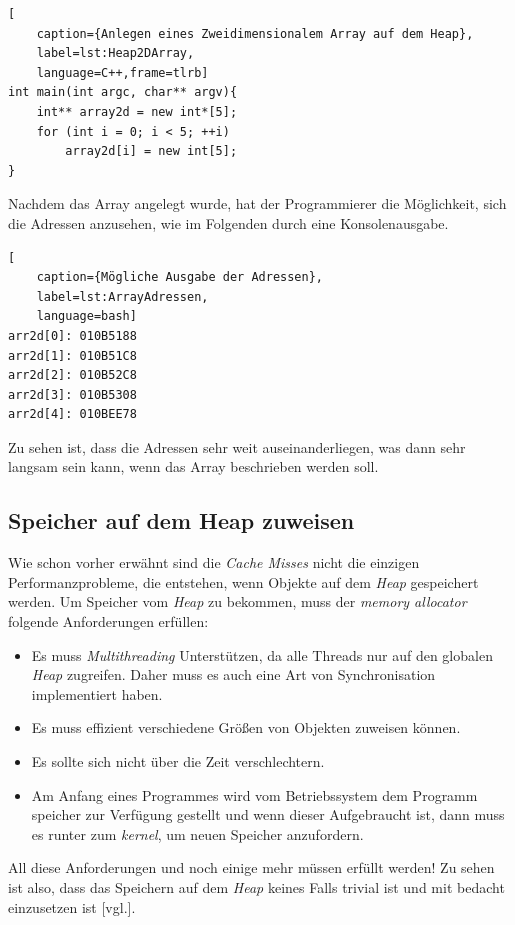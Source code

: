 \begin{lstlisting}[
    caption={Anlegen eines Zweidimensionalem Array auf dem Heap},
    label=lst:Heap2DArray,
    language=C++,frame=tlrb]
int main(int argc, char** argv){
	int** array2d = new int*[5];
	for (int i = 0; i < 5; ++i)
		array2d[i] = new int[5];
}
\end{lstlisting}

Nachdem das Array angelegt wurde, hat der Programmierer die Möglichkeit, sich die Adressen
anzusehen, wie im Folgenden durch eine Konsolenausgabe.

\begin{lstlisting}[
    caption={Mögliche Ausgabe der Adressen},
    label=lst:ArrayAdressen,
    language=bash]
arr2d[0]: 010B5188
arr2d[1]: 010B51C8
arr2d[2]: 010B52C8
arr2d[3]: 010B5308
arr2d[4]: 010BEE78
\end{lstlisting}

Zu sehen ist, dass die Adressen sehr weit auseinanderliegen, was dann sehr langsam sein kann,
wenn das Array beschrieben werden soll.

\subsection{Speicher auf dem Heap zuweisen}
Wie schon vorher erwähnt sind die \emph{Cache Misses} nicht die einzigen Performanzprobleme, die
entstehen, wenn Objekte auf dem \emph{Heap} gespeichert werden. Um Speicher vom \emph{Heap} zu
bekommen, muss der \emph{memory allocator} folgende Anforderungen erfüllen:

\begin{itemize}
    \item Es muss \emph{Multithreading} Unterstützen, da alle Threads nur auf den globalen
    \emph{Heap} zugreifen. Daher muss es auch eine Art von Synchronisation implementiert haben.
    \item Es muss effizient verschiedene Größen von Objekten zuweisen können.
    \item Es sollte sich nicht über die Zeit verschlechtern.
    \item Am Anfang eines Programmes wird vom Betriebssystem dem Programm speicher zur Verfügung
     gestellt und wenn dieser Aufgebraucht ist, dann muss es runter zum \emph{kernel}, um
     neuen Speicher anzufordern.
\end{itemize}

All diese Anforderungen und noch einige mehr müssen erfüllt werden! Zu sehen ist also, dass das
Speichern auf dem \emph{Heap} keines Falls trivial ist und mit bedacht einzusetzen ist
\cite{HandsOn}[vgl.].

